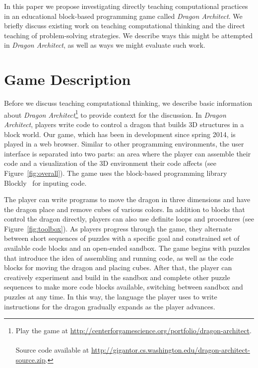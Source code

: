 \documentclass{sig-alternate}
\begin{document}
In this paper we propose investigating directly teaching computational practices in an educational block-based programming game called \emph{Dragon Architect}. 
We briefly discuss existing work on teaching computational thinking and the direct teaching of problem-solving strategies. 
We describe ways this might be attempted in \emph{Dragon Architect}, as well as ways we might evaluate such work. 

\section{Game Description}

Before we discuss teaching computational thinking, we describe basic information about \emph{Dragon Architect}\footnote{Play the game at \url{http://centerforgamescience.org/portfolio/dragon-architect}.\\\\Source code available at \url{http://gigantor.cs.washington.edu/dragon-architect-source.zip}.} to provide context for the discussion.
In \emph{Dragon Architect}, players write code to control a dragon that builds 3D structures in a block world.
Our game, which has been in development since spring 2014, is played in a web browser.
Similar to other programming environments, the user interface is separated into two parts: an area where the player can assemble their code and a visualization of the 3D environment their code affects (see Figure~\ref{fig:overall}). 
The game uses the block-based programming library Blockly~\cite{blockly} for inputing code.

The player can write programs to move the dragon in three dimensions and have the dragon place and remove cubes of various colors. 
In addition to blocks that control the dragon directly, players can also use definite loops and procedures (see Figure~\ref{fig:toolbox}).
As players progress through the game, they alternate between short sequences of puzzles with a specific goal and constrained set of available code blocks and an open-ended sandbox.
The game begins with puzzles that introduce the idea of assembling and running code, as well as the code blocks for moving the dragon and placing cubes.
After that, the player can creatively experiment and build in the sandbox and complete other puzzle sequences to make more code blocks available, switching between sandbox and puzzles at any time. 
In this way, the language the player uses to write instructions for the dragon gradually expands as the player advances.
\end{document}
